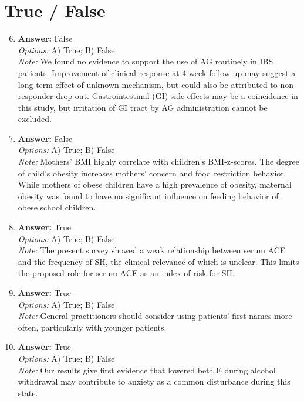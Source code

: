 \documentclass[12pt]{article}
\begin{document}
\section*{True / False}
\begin{enumerate}[label=\arabic*.]
\setcounter{enumi}{5}
\item \textbf{Answer:} False
\\ \textit{Options:} A) True; B) False
\\ \textit{Note:} We found no evidence to support the use of AG routinely in IBS patients. Improvement of clinical response at 4-week follow-up may suggest a long-term effect of unknown mechanism, but could also be attributed to non-responder drop out. Gastrointestinal (GI) side effects may be a coincidence in this study, but irritation of GI tract by AG administration cannot be excluded.
\item \textbf{Answer:} False
\\ \textit{Options:} A) True; B) False
\\ \textit{Note:} Mothers' BMI highly correlate with children's BMI-z-scores. The degree of child's obesity increases mothers' concern and food restriction behavior. While mothers of obese children have a high prevalence of obesity, maternal obesity was found to have no significant influence on feeding behavior of obese school children.
\item \textbf{Answer:} True
\\ \textit{Options:} A) True; B) False
\\ \textit{Note:} The present survey showed a weak relationship between serum ACE and the frequency of SH, the clinical relevance of which is unclear. This limits the proposed role for serum ACE as an index of risk for SH.
\item \textbf{Answer:} True
\\ \textit{Options:} A) True; B) False
\\ \textit{Note:} General practitioners should consider using patients' first names more often, particularly with younger patients.
\item \textbf{Answer:} True
\\ \textit{Options:} A) True; B) False
\\ \textit{Note:} Our results give first evidence that lowered beta E during alcohol withdrawal may contribute to anxiety as a common disturbance during this state.
\end{enumerate}
\end{document}
